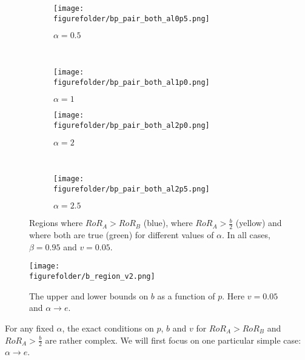 \begin{figure*}[t!]
\centering
\begin{subfigure}[t]{0.5\textwidth}
\centering
\texttt{[image: \\figurefolder/bp\_pair\_both\_al0p5.png]}
\caption{$\alpha = 0.5$}
\end{subfigure}%
~ 
\begin{subfigure}[t]{0.5\textwidth}
\centering
\texttt{[image: \\figurefolder/bp\_pair\_both\_al1p0.png]}
\caption{$\alpha = 1$}
\end{subfigure}
\centering
\begin{subfigure}[t]{0.5\textwidth}
\centering
\texttt{[image: \\figurefolder/bp\_pair\_both\_al2p0.png]}
\caption{$\alpha = 2$}
\end{subfigure}%
~ 
\begin{subfigure}[t]{0.5\textwidth}
\centering
\texttt{[image: \\figurefolder/bp\_pair\_both\_al2p5.png]}
\caption{$\alpha = 2.5$}
\end{subfigure}

\caption{{Regions where $RoR_A > RoR_B$ (blue), where $RoR_A > \frac{b}{2}$ (yellow) and where both are true (green) for different values of $\alpha$. In all cases, $\beta = 0.95$ and $v = 0.05$.}}
\label{fig:offer_reward_or_not}
\end{figure*}

\begin{figure*}[t]
\centering
\texttt{[image: \\figurefolder/b\_region\_v2.png]}
\caption{The upper and lower bounds on $b$ as a function of $p$. Here $v = 0.05$ and $\alpha \rightarrow e$.}
\label{fig:b_region}
\end{figure*}

For any fixed $\alpha$, the exact conditions on $p$, $b$ and $v$ for $RoR_A > RoR_B$ and $RoR_A > \frac{b}{2}$ are rather complex. We will first focus on one particular simple case: $\alpha \rightarrow e$. 

